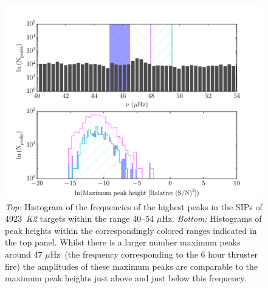 \documentclass[useAMS, usenatbib, preprint, 12pt]{aastex}
\newcommand{\nGO}{4923}
\newcommand{\uHz}{$\mu$Hz}
\begin{document}
\begin{figure}[h]
\begin{center}
\includegraphics[width=6in, clip=true]{sip_hist.pdf}
\caption{{\it Top:} Histogram of the frequencies of the highest peaks in the
	SIPs of \nGO\ {\it K2} targets within the range 40--54 \uHz.
	{\it Bottom:} Histograms of peak heights within the correspondingly
	colored ranges indicated in the top panel.
	Whilst there is a larger number maximum peaks around 47 \uHz\ (the
	frequency corresponding to the 6 hour thruster fire) the amplitudes of
	these maximum peaks are comparable to the maximum peak heights just
	above and just below this frequency.}
\label{fig:sip_hist}
\end{center}
\end{figure}
\end{document}

